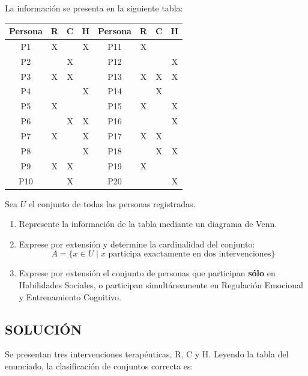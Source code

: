 \documentclass[12pt]{article}
\begin{document}
	La información se presenta en la siguiente tabla:
	\small{
		\begin{center}
			\begin{tabular}{|c|c|c|c||c|c|c|c|}
				\hline
				\textbf{Persona} & R & C & H & \textbf{Persona} & R & C & H \\
				\hline
				P1 & X &   & X & P11 & X &   &   \\
				P2 &   & X &   & P12 &   &   & X \\
				P3 & X & X &   & P13 & X & X & X \\
				P4 &   &   & X & P14 &   & X &   \\
				P5 & X &   &   & P15 & X &   & X \\
				P6 &   & X & X & P16 &   &   & X \\
				P7 & X &   & X & P17 & X & X &   \\
				P8 &   &   & X & P18 &   & X & X \\
				P9 & X & X &   & P19 & X &   &   \\
				P10 &   & X &   & P20 &   &   & X \\
				\hline
			\end{tabular}
	\end{center}}
	
	Sea $U$ el conjunto de todas las personas registradas.
	
	\begin{enumerate}[label=\alph*)]
		
		\item Represente la información de la tabla mediante un diagrama de Venn.
		
		\item Exprese por extensión y determine la cardinalidad del conjunto:
		\[
		A = \{x \in U \mid x \text{ participa exactamente en dos intervenciones}\}
		\]
		
		\item Exprese por extensión el conjunto de personas que participan \textbf{sólo} en Habilidades Sociales, o participan simultáneamente en Regulación Emocional y Entrenamiento Cognitivo.
		
	\end{enumerate}
	\subsection*{\textbf \Large SOLUCIÓN}
	Se presentan tres intervenciones terapéuticas, R, C y H. Leyendo la tabla del enunciado, la clasificación de conjuntos correcta es:
	
\end{document}
